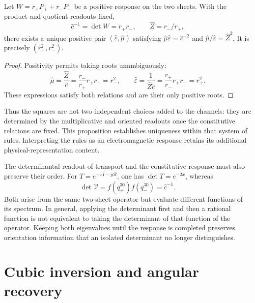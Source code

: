 \begin{proposition}
Let $W=r_+P_++r_-P_-$ be a positive response on the two sheets.
With the product and quotient readouts fixed,
\[
 \widehat c^{-1}=\det W=r_+r_-,
 \qquad \widehat Z=r_-/r_+,
\]
there exists a unique positive pair $(\widehat\varepsilon,\widehat\mu)$
satisfying
$\widehat\mu\widehat\varepsilon=\widehat c^{-2}$ and
$\widehat\mu/\widehat\varepsilon=\widehat Z^2$.
It is precisely $(r_+^2,r_-^2)$.
\end{proposition}
\begin{proof}
Positivity permits taking roots unambiguously:
\[
 \widehat\mu=\frac{\widehat Z}{\widehat c}
 =\frac{r_-}{r_+}r_+r_-=r_-^2,\qquad
 \widehat\varepsilon=\frac1{\widehat Z\widehat c}
 =\frac{r_+}{r_-}r_+r_-=r_+^2.
\]
These expressions satisfy both relations and are their only positive
roots.
\end{proof}

Thus the squares are not two independent choices added
to the channels: they are determined by the multiplicative and oriented
readouts once the constitutive relations are fixed. This proposition
establishes uniqueness within that system of rules. Interpreting
the rules as an electromagnetic response retains its additional
physical-representation content.

The determinantal readout of transport and the constitutive response
must also preserve their order. For $T=e^{-xI-y\mathcal R}$, one has
$\det T=e^{-2x}$, whereas
\[
 \det\mathcal V=f(q_+^{30})f(q_-^{30})=\widehat c^{-1}.
\]
Both arise from the same two-sheet operator but evaluate different
functions of its spectrum. In general, applying the determinant first
and then a rational function is not equivalent to taking the determinant of
that function of the operator. Keeping both eigenvalues until the
response is completed preserves orientation information that an isolated
determinant no longer distinguishes.

\section{Cubic inversion and angular recovery}

